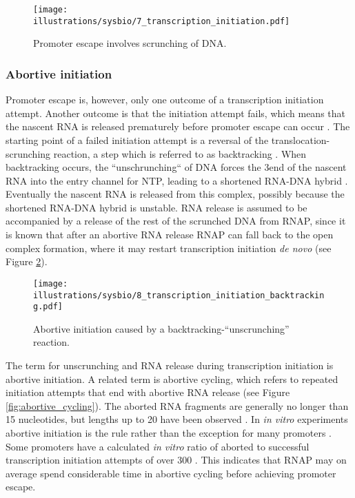 \begin{figure}[htb]
	\begin{center}
		\texttt{[image: illustrations/sysbio/7\_transcription\_initiation.pdf]}
	\end{center}
	\caption{Promoter escape involves scrunching of DNA.}
	\label{fig:simple_escape}
\end{figure}

\subsubsection{Abortive initiation}
Promoter escape is, however, only one outcome of a transcription initiation
attempt. Another outcome is that the initiation attempt fails, which means that
the nascent RNA is released prematurely before promoter escape can occur
\cite{early_cycling_paper_1982}. The
starting point of a failed initiation attempt is a reversal of the
translocation-scrunching reaction, a step which is referred to as backtracking
\cite{hsu_initial_2006}. When backtracking occurs, the ``unschrunching`` of
DNA forces the 3\ppp end of the nascent RNA into the entry channel for NTP,
leading to a shortened RNA-DNA hybrid \cite{hsu_initial_2006}. Eventually the
nascent RNA is released from this complex, possibly because the shortened
RNA-DNA hybrid is unstable. RNA release is assumed to be accompanied by a
release of the rest of the scrunched DNA from RNAP, since it is known that
after an abortive RNA release RNAP can fall back to the open complex
formation, where it may restart transcription initiation \textit{de novo}
\cite{hsu_promoter_2002} (see Figure \ref{fig:abortive_backtrack}).

\begin{figure}[htb]
	\begin{center}
		\texttt{[image: illustrations/sysbio/8\_transcription\_initiation\_backtracking.pdf]}
	\end{center}
	\caption{Abortive initiation caused by a backtracking-``unscrunching''
	reaction.}
	\label{fig:abortive_backtrack}
\end{figure}

The term for unscrunching and RNA release during transcription initiation is
abortive initiation. A related term is abortive cycling, which refers to
repeated initiation attempts that end with abortive RNA release (see Figure
\ref{fig:abortive_cycling}). The aborted RNA fragments are generally no longer
than 15 nucleotides, but lengths up to 20 have been observed
\cite{chander_alternate_2007}. In \textit{in vitro} experiments abortive
initiation is the rule rather than the exception for many promoters
\cite{hsu_promoter_2002}. Some promoters have a calculated \textit{in vitro}
ratio of aborted to successful transcription initiation attempts of over 300
\cite{hsu_initial_2006}. This indicates that RNAP may on average spend
considerable time in abortive cycling before achieving promoter escape.

